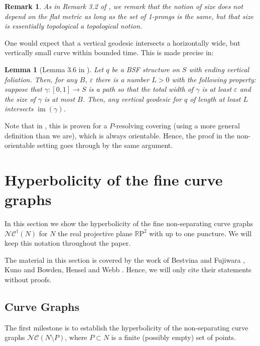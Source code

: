 \documentclass[a4paper]{article}
\let\epsilon\varepsilon %
\newtheorem{remark}[theorem]{Remark}
\newtheorem{lemma}[theorem]{Lemma}
\newcommand{\rp}{\mathbb{R}\mathrm{P}^2}
\newcommand{\ncg}{\mathcal{NC}}
\newcommand{\fncg}{\mathcal{NC}^\dagger}
\begin{document}
\begin{remark}
    As in Remark 3.2 of \cite{BHW2}, we remark that the notion of size does not depend on the flat metric as long as the set of 1-prongs is the same, but that size is essentially topological a topological notion.
\end{remark}

One would expect that a vertical geodesic intersects a horizontally wide, but vertically small curve within bounded time.
This is made precise in:

\begin{lemma}[Lemma 3.6 in \cite{BHW2}]\label{lem:target}
    Let $q$ be a BSF structure on $S$ with ending vertical foliation.
    Then, for any $B$, $\epsilon$ there is a number $L>0$ with the following property:
    suppose that $\gamma \colon [0,1]\rightarrow S$ is a path so that the total width of $\gamma$ is at least $\epsilon$ and the size of $\gamma$ is at most $B$.
    Then, any vertical geodesic for $q$ of length at least $L$ intersects $\operatorname{im}(\gamma)$.
\end{lemma}

Note that in \cite{BHW2}, this is proven for a $P$-resolving covering (using a more general definition than we are), which is always orientable.
Hence, the proof in the non-orientable setting goes through by the same argument.

\section{Hyperbolicity of the fine curve graphs}
In this section we show the hyperbolicity of the fine non-separating curve graphs $\fncg(N)$ for $N$ the real projective plane $\rp$ with up to one puncture.
We will keep this notation throughout the paper.

The material in this section is covered by the work of Bestvina and Fujiwara \cite{Bestvina-refinement}, Kuno \cite{kuno-hyperbolicity} and Bowden, Hensel and Webb \cite{BHW1}.
Hence, we will only cite their statements without proofs.

\subsection{Curve Graphs}\label{subsec:kuno-argument}

The first milestone is to establish the hyperbolicity of the non-separating curve graphs $\ncg(N\setminus P)$, where $P \subset N$ is a finite (possibly empty) set of points.
\end{document}

